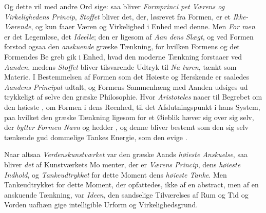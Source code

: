  Og dette vil med andre Ord sige: saa bliver \emph{Formprinci\-%
pet Værens og Virkelighedens Princip}, \emph{Stoffet} bliver
det, der, løsrevet fra Formen, er et \emph{Ikke-Værende}, og kun
faaer Væren og Virkelighed i Enhed med denne. Men \emph{For\-%
men} er det Legemløse, det \emph{Ideelle}; den er ligesom af \emph{Aan\-%
dens Slægt}, og ved Formen forstod ogsaa den \emph{anskuende}
græske Tænkning, for hvilken Formens og det Formendes Be\-%
greb gik i Enhed, hvad den moderne Tænkning forstaaer ved
\emph{Aanden}, medens \emph{Stoffet} bliver tilsvarende Udtryk til \emph{Na\-%
turen}, tænkt som Materie. I Bestemmelsen af Formen som
det Høieste og Herskende er saaledes \emph{Aandens Principat}
udtalt, og Formens Sammenhæng med Aanden udsiges ud\-%
trykkeligt af selve den græske Philosophie. Hvor \emph{Aristoteles}
naaer til Begrebet om den høieste , om Formen i dens
Reenhed, til det Afslutningspunkt i hans System, paa hvilket
den græske Tænkning ligesom for et Øieblik hæver sig over
sig selv, der \emph{bytter Formen Navn} og hedder , og
denne  bliver bestemt som den sig selv tænkende gud\-%
dommelige Tankes Energie, som den evige .

Naar altsaa \emph{Verdenskunstværket} var den græske Aands
\emph{høieste Anskuelse}, saa bliver \emph{det} af Kunstværkets Mo\-%
menter, der er \emph{Værens Princip}, dens \emph{høieste Indhold},
og \emph{Tankeudtrykket} for dette Moment dens \emph{høieste Tanke}.
Men Tankeudtrykket for dette Moment, der opfattedes, ikke
af en abstract, men af en anskuende Tænkning, var \emph{Ideen},
den sandselige Tilværelses af Rum og Tid og Vorden uafhæn\-%
gige intelligible Urform og Virkelighedsgrund.

